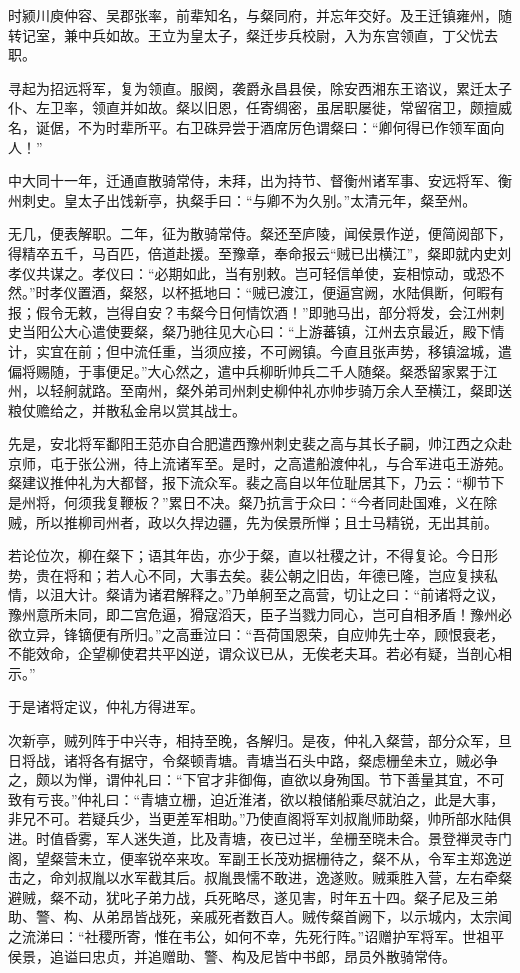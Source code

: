 \documentclass[12pt,UTF8]{ctexbook}
\begin{document}
时颍川庾仲容、吴郡张率，前辈知名，与粲同府，并忘年交好。及王迁镇雍州，随转记室，兼中兵如故。王立为皇太子，粲迁步兵校尉，入为东宫领直，丁父忧去职。

寻起为招远将军，复为领直。服阕，袭爵永昌县侯，除安西湘东王谘议，累迁太子仆、左卫率，领直并如故。粲以旧恩，任寄绸密，虽居职屡徙，常留宿卫，颇擅威名，诞倨，不为时辈所平。右卫硃异尝于酒席厉色谓粲曰：“卿何得已作领军面向人！”

中大同十一年，迁通直散骑常侍，未拜，出为持节、督衡州诸军事、安远将军、衡州刺史。皇太子出饯新亭，执粲手曰：“与卿不为久别。”太清元年，粲至州。

无几，便表解职。二年，征为散骑常侍。粲还至庐陵，闻侯景作逆，便简阅部下，得精卒五千，马百匹，倍道赴援。至豫章，奉命报云“贼已出横江”，粲即就内史刘孝仪共谋之。孝仪曰：“必期如此，当有别敕。岂可轻信单使，妄相惊动，或恐不然。”时孝仪置酒，粲怒，以杯抵地曰：“贼已渡江，便逼宫阙，水陆俱断，何暇有报；假令无敕，岂得自安？韦粲今日何情饮酒！”即驰马出，部分将发，会江州刺史当阳公大心遣使要粲，粲乃驰往见大心曰：“上游蕃镇，江州去京最近，殿下情计，实宜在前；但中流任重，当须应接，不可阙镇。今直且张声势，移镇湓城，遣偏将赐随，于事便足。”大心然之，遣中兵柳昕帅兵二千人随粲。粲悉留家累于江州，以轻舸就路。至南州，粲外弟司州刺史柳仲礼亦帅步骑万余人至横江，粲即送粮仗赡给之，并散私金帛以赏其战士。

先是，安北将军鄱阳王范亦自合肥遣西豫州刺史裴之高与其长子嗣，帅江西之众赴京师，屯于张公洲，待上流诸军至。是时，之高遣船渡仲礼，与合军进屯王游苑。粲建议推仲礼为大都督，报下流众军。裴之高自以年位耻居其下，乃云：“柳节下是州将，何须我复鞭板？”累日不决。粲乃抗言于众曰：“今者同赴国难，义在除贼，所以推柳司州者，政以久捍边疆，先为侯景所惮；且士马精锐，无出其前。

若论位次，柳在粲下；语其年齿，亦少于粲，直以社稷之计，不得复论。今日形势，贵在将和；若人心不同，大事去矣。裴公朝之旧齿，年德已隆，岂应复挟私情，以沮大计。粲请为诸君解释之。”乃单舸至之高营，切让之曰：“前诸将之议，豫州意所未同，即二宫危逼，猾寇滔天，臣子当戮力同心，岂可自相矛盾！豫州必欲立异，锋镝便有所归。”之高垂泣曰：“吾荷国恩荣，自应帅先士卒，顾恨衰老，不能效命，企望柳使君共平凶逆，谓众议已从，无俟老夫耳。若必有疑，当剖心相示。”

于是诸将定议，仲礼方得进军。

次新亭，贼列阵于中兴寺，相持至晚，各解归。是夜，仲礼入粲营，部分众军，旦日将战，诸将各有据守，令粲顿青塘。青塘当石头中路，粲虑栅垒未立，贼必争之，颇以为惮，谓仲礼曰：“下官才非御侮，直欲以身殉国。节下善量其宜，不可致有亏丧。”仲礼曰：“青塘立栅，迫近淮渚，欲以粮储船乘尽就泊之，此是大事，非兄不可。若疑兵少，当更差军相助。”乃使直阁将军刘叔胤师助粲，帅所部水陆俱进。时值昏雾，军人迷失道，比及青塘，夜已过半，垒栅至晓未合。景登禅灵寺门阁，望粲营未立，便率锐卒来攻。军副王长茂劝据栅待之，粲不从，令军主郑逸逆击之，命刘叔胤以水军截其后。叔胤畏懦不敢进，逸遂败。贼乘胜入营，左右牵粲避贼，粲不动，犹叱子弟力战，兵死略尽，遂见害，时年五十四。粲子尼及三弟助、警、构、从弟昂皆战死，亲戚死者数百人。贼传粲首阙下，以示城内，太宗闻之流涕曰：“社稷所寄，惟在韦公，如何不幸，先死行阵。”诏赠护军将军。世祖平侯景，追谥曰忠贞，并追赠助、警、构及尼皆中书郎，昂员外散骑常侍。
\end{document}
